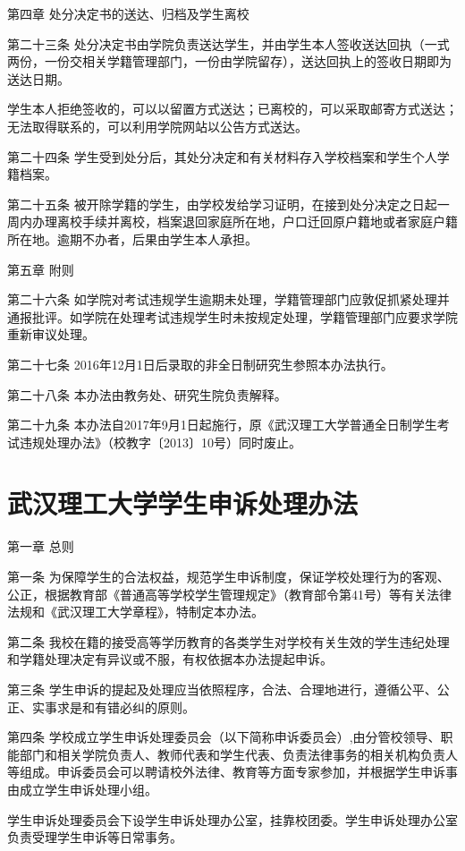 \documentclass[UTF8,12pt,a4paper]{report}
\begin{document}
第四章  处分决定书的送达、归档及学生离校

第二十三条  处分决定书由学院负责送达学生，并由学生本人签收送达回执（一式两份，一份交相关学籍管理部门，一份由学院留存），送达回执上的签收日期即为送达日期。

学生本人拒绝签收的，可以以留置方式送达；已离校的，可以采取邮寄方式送达；无法取得联系的，可以利用学院网站以公告方式送达。

第二十四条  学生受到处分后，其处分决定和有关材料存入学校档案和学生个人学籍档案。

第二十五条  被开除学籍的学生，由学校发给学习证明，在接到处分决定之日起一周内办理离校手续并离校，档案退回家庭所在地，户口迁回原户籍地或者家庭户籍所在地。逾期不办者，后果由学生本人承担。



第五章  附则

第二十六条  如学院对考试违规学生逾期未处理，学籍管理部门应敦促抓紧处理并通报批评。如学院在处理考试违规学生时未按规定处理，学籍管理部门应要求学院重新审议处理。

第二十七条  2016年12月1日后录取的非全日制研究生参照本办法执行。

第二十八条  本办法由教务处、研究生院负责解释。

第二十九条  本办法自2017年9月1日起施行，原《武汉理工大学普通全日制学生考试违规处理办法》（校教字〔2013〕10号）同时废止。

\chapter{武汉理工大学学生申诉处理办法}
第一章  总则

第一条  为保障学生的合法权益，规范学生申诉制度，保证学校处理行为的客观、公正，根据教育部《普通高等学校学生管理规定》（教育部令第41号）等有关法律法规和《武汉理工大学章程》，特制定本办法。

第二条  我校在籍的接受高等学历教育的各类学生对学校有关生效的学生违纪处理和学籍处理决定有异议或不服，有权依据本办法提起申诉。

第三条  学生申诉的提起及处理应当依照程序，合法、合理地进行，遵循公平、公正、实事求是和有错必纠的原则。

第四条  学校成立学生申诉处理委员会（以下简称申诉委员会）,由分管校领导、职能部门和相关学院负责人、教师代表和学生代表、负责法律事务的相关机构负责人等组成。申诉委员会可以聘请校外法律、教育等方面专家参加，并根据学生申诉事由成立学生申诉处理小组。

学生申诉处理委员会下设学生申诉处理办公室，挂靠校团委。学生申诉处理办公室负责受理学生申诉等日常事务。
\end{document}
